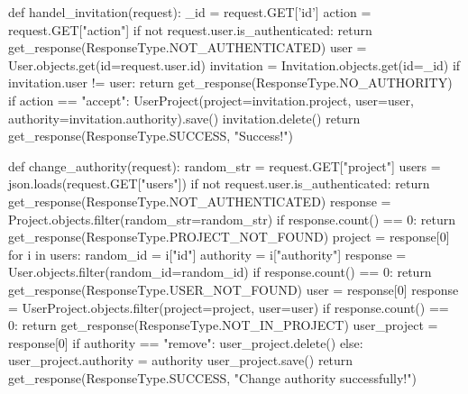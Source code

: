 def handel_invitation(request):
    _id = request.GET['id']
    action = request.GET["action"]
    if not request.user.is_authenticated:
        return get_response(ResponseType.NOT_AUTHENTICATED)
    user = User.objects.get(id=request.user.id)
    invitation = Invitation.objects.get(id=_id)
    if invitation.user != user:
        return get_response(ResponseType.NO_AUTHORITY)
    if action == "accept":
        UserProject(project=invitation.project, user=user, authority=invitation.authority).save()
    invitation.delete()
    return get_response(ResponseType.SUCCESS, "Success!")


def change_authority(request):
    random_str = request.GET["project"]
    users = json.loads(request.GET["users"])
    if not request.user.is_authenticated:
        return get_response(ResponseType.NOT_AUTHENTICATED)
    response = Project.objects.filter(random_str=random_str)
    if response.count() == 0:
        return get_response(ResponseType.PROJECT_NOT_FOUND)
    project = response[0]
    for i in users:
        random_id = i["id"]
        authority = i["authority"]
        response = User.objects.filter(random_id=random_id)
        if response.count() == 0:
            return get_response(ResponseType.USER_NOT_FOUND)
        user = response[0]
        response = UserProject.objects.filter(project=project, user=user)
        if response.count() == 0:
            return get_response(ResponseType.NOT_IN_PROJECT)
        user_project = response[0]
        if authority == "remove":
            user_project.delete()
        else:
            user_project.authority = authority
            user_project.save()
    return get_response(ResponseType.SUCCESS, "Change authority successfully!")
